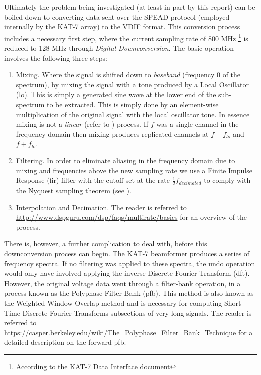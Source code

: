 \documentclass[a4paper,10pt]{article}
\begin{document}
Ultimately the problem being investigated (at least in part by this report) can be boiled down to converting data sent over the SPEAD protocol (employed 
internally by the KAT-7 array) to the VDIF format. This conversion process includes a necessary first step, where the current sampling rate of 800 MHz
\footnote{According to the KAT-7 Data Interface document} is reduced to 128 MHz through \textit{Digital Downconversion}. The basic operation involves the following three
steps:
\begin{enumerate}
 \item Mixing. Where the signal is shifted down to \textit{baseband} (frequency 0 of the spectrum), by mixing the signal with a tone produced by a Local Oscillator (\gls{lo}).
 This is simply a generated sine wave at the lower end of the sub-spectrum to be extracted. This is simply done by an element-wise multiplication of the original signal with
 the local oscillator tone. In essence mixing is not a \textit{linear} (refer to \cite[ch. 5]{smith1997scientist}) process. If $f$ was a single channel in the 
 frequency domain then mixing produces replicated channels at $f - f_{lo}$ and $f + f_{lo}$.
 \item Filtering. In order to eliminate aliasing in the frequency domain due to mixing and frequencies above the new sampling rate we use a Finite Impulse Response 
 (\gls{fir}) filter with the cutoff set at the rate $\frac{1}{2}f_{decimated}$ to comply with the Nyquest sampling theorem (see \cite[ch. 3]{smith1997scientist}).
 \item Interpolation and Decimation. The reader is referred to \url{http://www.dspguru.com/dsp/faqs/multirate/basics} for an overview of the process.  
\end{enumerate}

There is, however, a further complication to deal with, before this downconversion process can begin. The KAT-7 beamformer produces a series of frequency spectra. If no filtering 
was applied to these spectra, the undo operation would only have involved applying the inverse Discrete Fourier Transform (\gls{dft}). However, the original voltage data went 
through a filter-bank operation, in a process known as the Polyphase Filter Bank (\gls{pfb}). This method is also known as the Weighted Window Overlap method and is necessary for computing 
Short Time Discrete Fourier Transforms subsections of very long signals. The reader is referred to \url{https://casper.berkeley.edu/wiki/The_Polyphase_Filter_Bank_Technique} for a detailed 
description on the forward \gls{pfb}.
\end{document}
